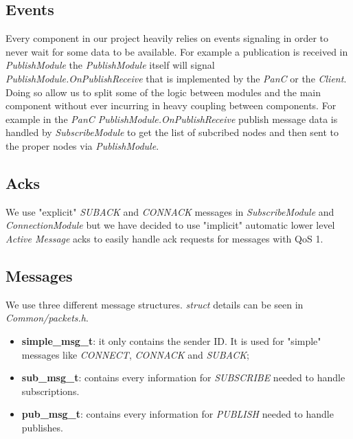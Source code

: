 \documentclass[10pt]{article}
\begin{document}
\subsection{Events}
Every component in our project heavily relies on events signaling in order to never wait for some data to be available. For example a publication is received in \emph{PublishModule} the \emph{PublishModule} itself will signal \emph{PublishModule.OnPublishReceive} that is implemented by the \emph{PanC} or the \emph{Client}. Doing so allow us to split some of the logic between modules and the main component without ever incurring in heavy coupling between components. For example in the \emph{PanC PublishModule.OnPublishReceive} publish message data is handled by \emph{SubscribeModule} to get the list of subcribed nodes and then sent to the proper nodes via \emph{PublishModule}.

\subsection{Acks}

We use "explicit" \emph{SUBACK} and \emph{CONNACK} messages in \emph{SubscribeModule} and \emph{ConnectionModule} but we have decided to use "implicit" automatic lower level \emph{Active Message} acks to easily handle ack requests for messages with QoS 1.

\subsection{Messages}

We use three different message structures. \emph{struct} details can be seen in \emph{Common/packets.h}.
\begin{itemize}
\item \textbf{simple\_msg\_t}: it only contains the sender ID. It is used for "simple" messages like \emph{CONNECT}, \emph{CONNACK} and \emph{SUBACK};
\item	\textbf{sub\_msg\_t}: contains every information for \emph{SUBSCRIBE} needed to handle subscriptions.
\item \textbf{pub\_msg\_t}: contains every information for \emph{PUBLISH} needed to handle publishes.
\end{itemize}
\end{document}
